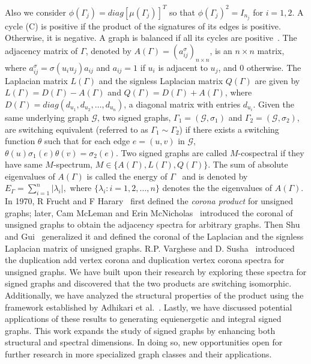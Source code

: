 \documentclass[12pt,a4paper]{article}
\theoremstyle{definition}
\theoremstyle{remark}
\begin{document}
    Also we consider $\phi(\Gamma_j)=diag[\mu(\Gamma_j)]^T$ so that $\phi(\Gamma_j)^2=I_{n_j}$ for $i=1,2.$
    A cycle (C) is positive if the product of the signatures of its edges is positive. Otherwise, it is negative. A graph is balanced if all its cycles are positive~\cite{harary1953notion}.
    The adjacency matrix of $\Gamma$, denoted by $A(\Gamma)=(a^{\sigma}_{ij})_{n\times n}$, is an $n\times n$ matrix, where $a_{ij}^\sigma=\sigma(u_iu_j)a_{ij}$ and $a_{ij}=1$ if $u_i$ is adjacent to $u_j$, and $0$ otherwise. The Laplacian matrix $L(\Gamma)$ and the signless Laplacian matrix $Q(\Gamma)$ are given by $L(\Gamma)=D(\Gamma)-A(\Gamma)$ and $Q(\Gamma)=D(\Gamma)+A(\Gamma)$, where $D(\Gamma)=diag(d_{u_1},d_{u_2},\ldots,d_{u_n})$, a diagonal matrix with entries $d_{u_i}$. Given the same underlying graph $\mathcal{G}$, two signed graphs, $\Gamma_1=(\mathcal{G},\sigma_1)$ and $\Gamma_2=(\mathcal{G},\sigma_2)$, are switching equivalent (referred to as $\Gamma_1 \sim \Gamma_2$) if there exists a switching function $\theta$ such that for each edge $e=(u,v)$ in $\mathcal{G}$, $\theta(u)\sigma_1(e)\theta(v)=\sigma_2(e)$.
    Two signed graphs are called $M$-cospectral if they have same $M$-spectrum, $M\in\{A(\Gamma),L(\Gamma),Q(\Gamma)\}.$
    The sum of absolute eigenvalues of $A(\Gamma)$ is called the energy of $\Gamma$~\cite{bhat2015equienergetic} and is denoted by $E_{\Gamma}=\sum_{i=1}^n|\lambda_i|,$ where $\{\lambda_i:i=1,2,\ldots,n\}$ denotes the the eigenvalues of $A(\Gamma)$.\\

    In 1970, R Frucht and F Harary~\cite{frucht1970corona} first defined the \textit{corona product} for unsigned graphs; later, Cam McLeman and Erin McNicholas~\cite{mcleman2011spectra} introduced the coronal of unsigned graphs to obtain the adjacency spectra for arbitrary graphs. Then Shu and Gui~\cite{cui2012spectrum} generalized it and defined the coronal of the Laplacian and the signless Laplacian matrix of unsigned graphs. R.P. Varghese and D. Susha~\cite{varghese2017spectrum} introduced the duplication add vertex corona and duplication vertex corona spectra for unsigned graphs. We have built upon their research by exploring these spectra for signed graphs and discovered that the two products are switching isomorphic. Additionally, we have analyzed the structural properties of the product using the framework established by Adhikari et al.~\cite{adhikari2023corona}. Lastly, we have discussed potential applications of these results to generating equienergetic and integral signed graphs. This work expands the study of signed graphs by enhancing both structural and spectral dimensions. In doing so, new opportunities open for further research in more specialized graph classes and their applications.
\end{document}
